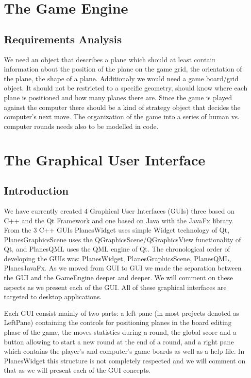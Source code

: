 \documentclass{report}
\begin{document}
\chapter {The Game Engine }
\section{Requirements Analysis}
We need an object that describes a plane which should at least contain information about the position of the plane on the game grid, the orientation of the plane, the shape of a plane. Additionaly we would need a game board/grid object. It should not be restricted to a specific geometry, should know where each plane is positioned and how many planes there are. Since the game is played against the computer there should be a kind of strategy object that decides the computer's next move. The organization of the game into a series of human vs. computer rounds needs also to be modelled in code.







\chapter {The Graphical User Interface}

\section{Introduction}

We have currently created 4 Graphical User Interfaces (GUIs) three based on C++ and the Qt Framework and one based on Java with the JavaFx library. From the 3 C++ GUIs PlanesWidget uses simple Widget technology of Qt, PlanesGraphicsScene uses the QGraphicsScene/QGraphicsView functionality of Qt, and PlanesQML uses the QML engine of Qt. The chronological order of developing the GUIs was: PlanesWidget, PlanesGraphicsScene, PlanesQML, PlanesJavaFx. As we moved from GUI to GUI we made the separation between the GUI and the GameEngine deeper and deeper. We will comment on these aspects as we present each of the GUI. All of these graphical interfaces are targeted to desktop applications.

Each GUI consist mainly of two parts: a left pane (in most projects denoted as LeftPane) containing the controls for positioning planes in the board editing phase of the game, the moves statistics during a round, the global score and a button allowing to start a new round at the end of a round, and a right pane which contains the player's and computer's game boards as well as a help file. In PlanesWidget this structure is not completely respected and we will comment on that as we will present each of the GUI concepts.





\end{document}
